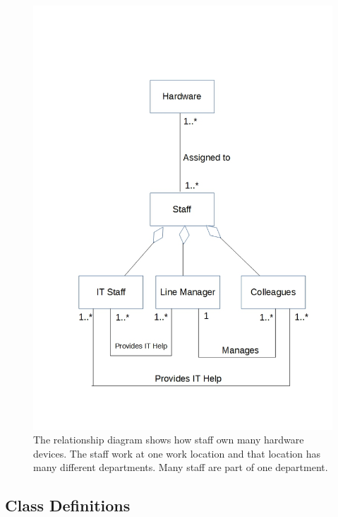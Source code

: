 \begin{figure}[H]
\hspace*{-1.3cm}
\vspace*{-1cm}
\includegraphics[width=1\textwidth]{RelationshipDiagram.jpg}
\caption{The relationship diagram shows how staff own many hardware devices. The staff work at one work location and that location has many different departments. Many staff are part of one department. } \label{Relationship Diagrams}
\end{figure}

\subsection{Class Definitions}

